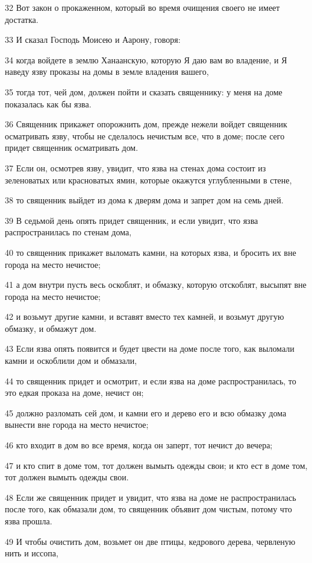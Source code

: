 \par 32 Вот закон о прокаженном, который во время очищения своего не имеет достатка.
\par 33 И сказал Господь Моисею и Аарону, говоря:
\par 34 когда войдете в землю Ханаанскую, которую Я даю вам во владение, и Я наведу язву проказы на домы в земле владения вашего,
\par 35 тогда тот, чей дом, должен пойти и сказать священнику: у меня на доме показалась как бы язва.
\par 36 Священник прикажет опорожнить дом, прежде нежели войдет священник осматривать язву, чтобы не сделалось нечистым все, что в доме; после сего придет священник осматривать дом.
\par 37 Если он, осмотрев язву, увидит, что язва на стенах дома состоит из зеленоватых или красноватых ямин, которые окажутся углубленными в стене,
\par 38 то священник выйдет из дома к дверям дома и запрет дом на семь дней.
\par 39 В седьмой день опять придет священник, и если увидит, что язва распространилась по стенам дома,
\par 40 то священник прикажет выломать камни, на которых язва, и бросить их вне города на место нечистое;
\par 41 а дом внутри пусть весь оскоблят, и обмазку, которую отскоблят, высыпят вне города на место нечистое;
\par 42 и возьмут другие камни, и вставят вместо тех камней, и возьмут другую обмазку, и обмажут дом.
\par 43 Если язва опять появится и будет цвести на доме после того, как выломали камни и оскоблили дом и обмазали,
\par 44 то священник придет и осмотрит, и если язва на доме распространилась, то это едкая проказа на доме, нечист он;
\par 45 должно разломать сей дом, и камни его и дерево его и всю обмазку дома вынести вне города на место нечистое;
\par 46 кто входит в дом во все время, когда он заперт, тот нечист до вечера;
\par 47 и кто спит в доме том, тот должен вымыть одежды свои; и кто ест в доме том, тот должен вымыть одежды свои.
\par 48 Если же священник придет и увидит, что язва на доме не распространилась после того, как обмазали дом, то священник объявит дом чистым, потому что язва прошла.
\par 49 И чтобы очистить дом, возьмет он две птицы, кедрового дерева, червленую нить и иссопа,
